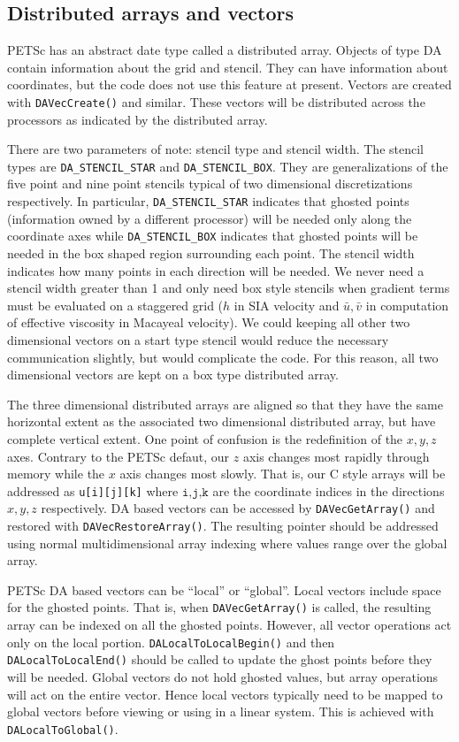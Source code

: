 \documentclass[11pt,final]{amsart}
\begin{document}
\subsection{Distributed arrays and vectors}
PETSc has an abstract date type called a distributed array. Objects of type DA contain
information about the grid and stencil. They can have information about coordinates, but
the code does not use this feature at present. Vectors are created with
\texttt{DAVecCreate()} and similar. These vectors will be distributed across the
processors as indicated by the distributed array.

There are two parameters of note: stencil type and stencil width. The stencil types are
\verb|DA_STENCIL_STAR| and \verb|DA_STENCIL_BOX|. They are generalizations of the five
point and nine point stencils typical of two dimensional discretizations respectively. In
particular, \verb|DA_STENCIL_STAR| indicates that ghosted points (information owned by a
different processor) will be needed only along the coordinate axes while
\verb|DA_STENCIL_BOX| indicates that ghosted points will be needed in the box shaped
region surrounding each point. The stencil width indicates how many points in each
direction will be needed. We never need a stencil width greater than 1 and only need box
style stencils when gradient terms must be evaluated on a staggered grid ($h$ in SIA
velocity and $\bar{u},\bar{v}$ in computation of effective viscosity in Macayeal
velocity). We could keeping all other two dimensional vectors on a start type stencil
would reduce the necessary communication slightly, but would complicate the code. For this
reason, all two dimensional vectors are kept on a box type distributed array.

The three dimensional distributed arrays are aligned so that they have the same horizontal
extent as the associated two dimensional distributed array, but have complete vertical
extent. One point of confusion is the redefinition of the $x,y,z$ axes. Contrary to the
PETSc defaut, our $z$ axis changes most rapidly through memory while the $x$ axis changes
most slowly. That is, our C style arrays will be addressed as \texttt{u[i][j][k]} where
$\texttt{i,j,k}$ are the coordinate indices in the directions $x,y,z$ respectively. DA
based vectors can be accessed by \texttt{DAVecGetArray()} and restored with
\texttt{DAVecRestoreArray()}. The resulting pointer should be addressed using normal
multidimensional array indexing where values range over the global array.

PETSc DA based vectors can be ``local'' or ``global''. Local vectors include space for the
ghosted points. That is, when \texttt{DAVecGetArray()} is called, the resulting array can
be indexed on all the ghosted points. However, all vector operations act only on the local
portion. \texttt{DALocalToLocalBegin()} and then \texttt{DALocalToLocalEnd()} should be
called to update the ghost points before they will be needed. Global vectors do not hold
ghosted values, but array operations will act on the entire vector. Hence local vectors
typically need to be mapped to global vectors before viewing or using in a linear system.
This is achieved with \texttt{DALocalToGlobal()}.
\end{document}
